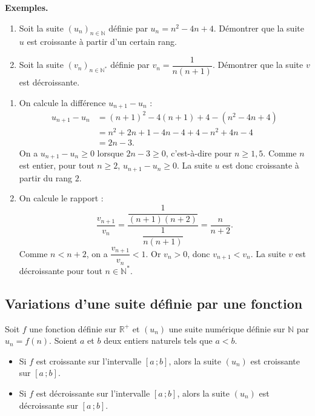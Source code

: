 \documentclass[11pt]{article}
\newcommand{\RR}{\mathbb{R}}
\newcommand{\NN}{\mathbb{N}}
\newenvironment{exemples}{\par\smallskip\noindent\textbf{Exemples. \\}\ignorespaces}{\par\smallskip}
\begin{document}
\begin{exemples}
\begin{enumerate}[label=\arabic*.]
    \item Soit la suite $(u_n)_{n\in\NN}$ définie par $u_n=n^2-4n+4$. Démontrer que la suite $u$ est croissante à partir d'un certain rang.
    \item Soit la suite $(v_n)_{n\in\NN^*}$ définie par $v_n=\dfrac{1}{n(n+1)}$. Démontrer que la suite $v$ est décroissante.
\end{enumerate}

\begin{enumerate}[label=\arabic*.]
    \item On calcule la différence $u_{n+1}-u_n$ :
    \begin{align*}
    u_{n+1}-u_n
    &=(n+1)^2-4(n+1)+4-(n^2-4n+4)\\
    &=n^2+2n+1-4n-4+4-n^2+4n-4\\
    &=2n-3.
    \end{align*}
    On a $u_{n+1}-u_n\geq0$ lorsque $2n-3\geq0$, c'est-à-dire pour $n\geq1{,}5$. Comme $n$ est entier, pour tout $n\geq2$, $u_{n+1}-u_n\geq0$. La suite $u$ est donc croissante à partir du rang $2$.

    \item On calcule le rapport :
    \[
    \frac{v_{n+1}}{v_n}
    =\frac{\dfrac{1}{(n+1)(n+2)}}{\dfrac{1}{n(n+1)}}
    =\frac{n}{n+2}.
    \]
    Comme $n<n+2$, on a $\dfrac{v_{n+1}}{v_n}<1$. Or $v_n>0$, donc $v_{n+1}<v_n$. La suite $v$ est décroissante pour tout $n\in\NN^*$.
\end{enumerate}
\end{exemples}

\subsection{Variations d'une suite définie par une fonction}

\begin{propriete}
Soit $f$ une fonction définie sur $\RR^+$ et $(u_n)$ une suite numérique définie sur $\NN$ par $u_n=f(n)$. Soient $a$ et $b$ deux entiers naturels tels que $a<b$.
\begin{itemize}
    \item Si $f$ est croissante sur l'intervalle $[a\,;b]$, alors la suite $(u_n)$ est croissante sur $[a\,;b]$.
    \item Si $f$ est décroissante sur l'intervalle $[a\,;b]$, alors la suite $(u_n)$ est décroissante sur $[a\,;b]$.
\end{itemize}
\end{propriete}
\end{document}
